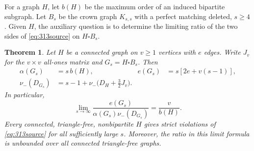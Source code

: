 \documentclass[11pt,a4paper]{article}
\newtheorem{theorem}{Theorem}[section]
\begin{document}
For a graph $H$, let $b(H)$ be the maximum order of an induced bipartite
subgraph. Let $B_s$ be the crown graph $K_{s,s}$ with a perfect matching
deleted, $s\ge4$. Given $H$, the auxiliary question is to determine the
limiting ratio of the two sides of \eqref{eq:313source} on $H\square B_s$.

\begin{theorem}\label{thm:313limit}
Let $H$ be a connected graph on $v\ge1$ vertices with $e$ edges. Write
$J_v$ for the $v\times v$ all-ones matrix and $G_s=H\square B_s$. Then
\begin{align*}
 \alpha(G_s)&=s\,b(H), & e(G_s)&=s[2e+v(s-1)],\\
 \nu_-(D_{G_s})&=s-1+\nu_-\bigl(D_H+\tfrac32 J_v\bigr).
\end{align*}
In particular,
\[
 \lim_{s\to\infty}\frac{e(G_s)}{\alpha(G_s)\nu_-(D_{G_s})}
 =\frac{v}{b(H)}.
\]
Every connected, triangle-free, nonbipartite $H$ gives strict violations
of \eqref{eq:313source} for all sufficiently large $s$. Moreover, the
ratio in this limit formula is unbounded over all connected triangle-free
graphs.
\end{theorem}
\end{document}
